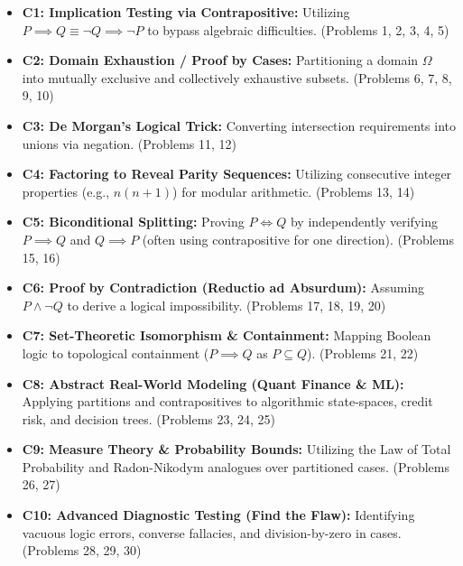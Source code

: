 \documentclass[11pt]{article}
\begin{document}
\begin{itemize}
    \item \textbf{C1: Implication Testing via Contrapositive:} Utilizing $P \implies Q \equiv \neg Q \implies \neg P$ to bypass algebraic difficulties. (Problems 1, 2, 3, 4, 5)
    \item \textbf{C2: Domain Exhaustion / Proof by Cases:} Partitioning a domain $\Omega$ into mutually exclusive and collectively exhaustive subsets. (Problems 6, 7, 8, 9, 10)
    \item \textbf{C3: De Morgan's Logical Trick:} Converting intersection requirements into unions via negation. (Problems 11, 12)
    \item \textbf{C4: Factoring to Reveal Parity Sequences:} Utilizing consecutive integer properties (e.g., $n(n+1)$) for modular arithmetic. (Problems 13, 14)
    \item \textbf{C5: Biconditional Splitting:} Proving $P \iff Q$ by independently verifying $P \implies Q$ and $Q \implies P$ (often using contrapositive for one direction). (Problems 15, 16)
    \item \textbf{C6: Proof by Contradiction (Reductio ad Absurdum):} Assuming $P \land \neg Q$ to derive a logical impossibility. (Problems 17, 18, 19, 20)
    \item \textbf{C7: Set-Theoretic Isomorphism \& Containment:} Mapping Boolean logic to topological containment ($P \implies Q$ as $P \subseteq Q$). (Problems 21, 22)
    \item \textbf{C8: Abstract Real-World Modeling (Quant Finance \& ML):} Applying partitions and contrapositives to algorithmic state-spaces, credit risk, and decision trees. (Problems 23, 24, 25)
    \item \textbf{C9: Measure Theory \& Probability Bounds:} Utilizing the Law of Total Probability and Radon-Nikodym analogues over partitioned cases. (Problems 26, 27)
    \item \textbf{C10: Advanced Diagnostic Testing (Find the Flaw):} Identifying vacuous logic errors, converse fallacies, and division-by-zero in cases. (Problems 28, 29, 30)
\end{itemize}
\end{document}
